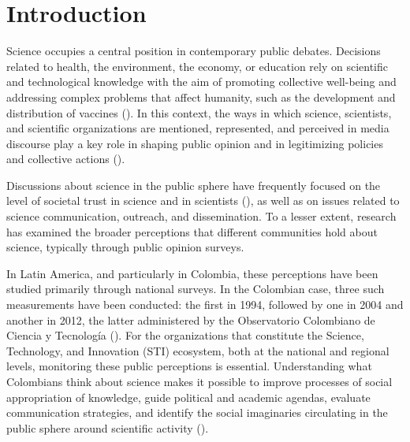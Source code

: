 \documentclass[pdflatex,sn-mathphys-num,iicol]{sn-jnl}
\begin{document}
	\maketitle
	
	\section{Introduction}\label{sec:intro}
	
	Science occupies a central position in contemporary public debates. Decisions related to health, the environment, the economy, or education rely on scientific and technological knowledge with the aim of promoting collective well-being and addressing complex problems that affect humanity, such as the development and distribution of vaccines (\cite{Chakravartty2022}). In this context, the ways in which science, scientists, and scientific organizations are mentioned, represented, and perceived in media discourse play a key role in shaping public opinion and in legitimizing policies and collective actions (\cite{Mede2022}).
	
	Discussions about science in the public sphere have frequently focused on the level of societal trust in science and in scientists (\cite{Cologna2025, Sturgis2021, Mede2022}), as well as on issues related to science communication, outreach, and dissemination. To a lesser extent, research has examined the broader perceptions that different communities hold about science, typically through public opinion surveys.
	
	In Latin America, and particularly in Colombia, these perceptions have been studied primarily through national surveys. In the Colombian case, three such measurements have been conducted: the first in 1994, followed by one in 2004 and another in 2012, the latter administered by the Observatorio Colombiano de Ciencia y Tecnolog{\'i}a (\cite{Daza_Caicedo2014}). For the organizations that constitute the Science, Technology, and Innovation (STI) ecosystem, both at the national and regional levels, monitoring these public perceptions is essential. Understanding what Colombians think about science makes it possible to improve processes of social appropriation of knowledge, guide political and academic agendas, evaluate communication strategies, and identify the social imaginaries circulating in the public sphere around scientific activity (\cite{Daza_Caicedo2014}).
	
\end{document}

